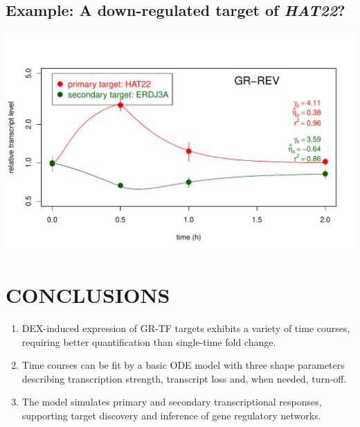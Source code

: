 \documentclass[aspb,landscape]{a0poster}
\newlength{\figwidth}
\begin{document}
\begin{multicols}{4}
  \subsection*{Example: A down-regulated target of \textit{HAT22}?}

  \begin{minipage}[t]{1.0\linewidth}
    \includegraphics[width=\figwidth]{HAT22-ERDJ3A}
  \end{minipage}

  

  \section*{CONCLUSIONS}
  \color{CarnegiePriBlue}
  
  \begin{enumerate}
  \item DEX-induced expression of GR-TF targets exhibits a variety of time courses, requiring better quantification than single-time fold change.
  \item Time courses can be fit by a basic ODE model with three shape parameters describing transcription strength, transcript loss and, when needed, turn-off.
  \item The model simulates primary and secondary transcriptional responses, supporting target discovery and inference of gene regulatory networks.
  \end{enumerate}


\end{multicols}
\end{document}
